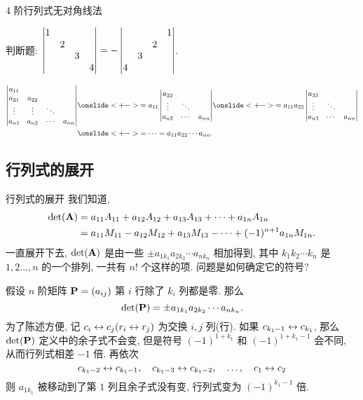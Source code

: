 \begin{frame}{$4$ 阶行列式无对角线法}
	\onslide<+->
	\begin{exercise}
		判断题: $\left|\begin{matrix}1&&&\\&2&&\\&&3&\\&&&4\end{matrix}\right|=-\left|\begin{matrix}&&&1\\&&2&\\&3&&\\4&&&\end{matrix}\right|$. \visible<+->{\Huge\color{red}{$\times$}}
	\end{exercise}
	\onslide<+->
	\begin{example}
		\begin{align*}
			\detm{a_{11}&      &      &\\
			a_{21}&a_{22}&      &\\
			\vdots&\vdots&\ddots&\\
			a_{n1}&a_{n2}&\cdots&a_{nn}}
		&\onslide<+->{=a_{11}\detm{
			a_{22}&      &\\
			\vdots&\ddots&\\
			a_{n2}&\cdots&a_{nn}
		}}
		\onslide<+->{=a_{11}a_{22}\detm{
			a_{33}&      &\\
			\vdots&\ddots&\\
			a_{n3}&\cdots&a_{nn}
		}}\\
		&\onslide<+->{=\cdots=a_{11}a_{22}\cdots a_{nn}.}
		\end{align*}
	\end{example}
\end{frame}


\subsection{行列式的展开}
\begin{frame}{行列式的展开}
	\onslide<+->
	我们知道,
	\begin{align*}	
	\det({\mathbf{A}})&=a_{11}A_{11}+a_{12}A_{12}+a_{13}A_{13}+\cdots+a_{1n}A_{1n}\\
	&=a_{11}M_{11}-a_{12}M_{12}+a_{13}M_{13}-\cdots+(-1)^{n+1}a_{1n}M_{1n}.
	\end{align*}
	\onslide<+->
	一直展开下去, $\det({\mathbf{A}})$ 是由一些 $\pm a_{1 k_1}a_{2 k_2}\cdots a_{n k_n}$ 相加得到, 其中 $k_1 k_2 \cdots k_n$ 是 $1,2\dots,n$ 的一个排列, 一共有 $n!$ 个这样的项.
	\onslide<+->
	问题是如何确定它的符号?
	
	\onslide<+->
	假设 $n$ 阶矩阵 ${\mathbf{P}}=(a_{ij})$ 第 $i$ 行除了 $k_i$ 列都是零.
	那么
	\[\det({\mathbf{P}})=\pm a_{1 k_1}a_{2 k_2}\cdots a_{n k_n}.\]
	\onslide<+->
	为了陈述方便, 记 \alert{$c_i\leftrightarrow c_j (r_i\leftrightarrow r_j)$} 为交换 $i,j$ 列(行).
	\onslide<+->
	如果 $c_{k_1-1}\leftrightarrow c_{k_1}$, 那么 $\det({\mathbf{P}})$ 定义中的余子式不会变, 但是符号 $(-1)^{1+k_1}$ 和 $(-1)^{1+k_1-1}$ 会不同, 从而行列式相差 $-1$ 倍.
	\onslide<+->
	再依次
	\[c_{k_1-2}\leftrightarrow c_{k_1-1},\quad c_{k_1-3}\leftrightarrow c_{k_1-2},\quad \dots,\quad c_1\leftrightarrow c_2\]
	则 $a_{1k_1}$ 被移动到了第 $1$ 列且余子式没有变, 行列式变为 $(-1)^{k_1-1}$ 倍.
\end{frame}


